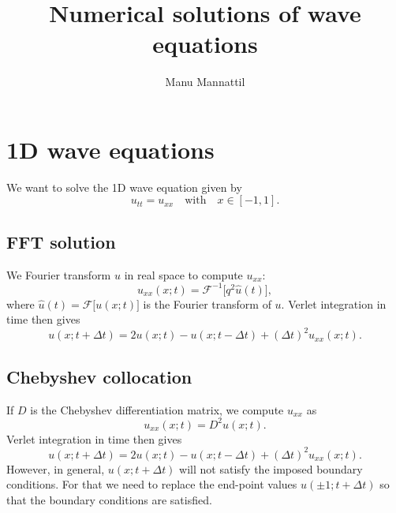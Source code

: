\documentclass[11pt]{article}
\def\FT#1{\ensuremath{\mathcal{F}{#1}}}
\def\FTI#1{\ensuremath{\mathcal{F}^{-1}{#1}}}
\begin{document}
\title{Numerical solutions of wave equations}
\author{Manu Mannattil}
\maketitle

\section{1D wave equations}

We want to solve the 1D wave equation given by
%
\begin{equation}
  u_{tt} = u_{xx}\quad\text{with}\quad x \in [-1, 1].
\end{equation}
%

\subsection{FFT solution}

We Fourier transform $u$ in real space to compute $u_{xx}$:
%
\begin{equation}
  u_{xx}(x; t) = \FTI[q^{2}\hat{u}(t)],
\end{equation}
%
where $\hat{u}(t) = \FT[u(x; t)]$ is the Fourier transform of $u$.
Verlet integration in time then gives
%
\begin{equation}
  u(x; {t + \Delta t}) = 2u(x; t) - u(x; t - \Delta t) + (\Delta t)^{2}u_{xx}(x; t).
\end{equation}

\subsection{Chebyshev collocation}

If $D$ is the Chebyshev differentiation matrix, we compute $u_{xx}$ as
%
\begin{equation}
  u_{xx}(x; t) = D^{2}u(x; t).
\end{equation}
%
Verlet integration in time then gives
%
\begin{equation}
  u(x; {t + \Delta t}) = 2u(x; t) - u(x; t - \Delta t) + (\Delta t)^{2}u_{xx}(x; t).
\end{equation}
%
However, in general, $u(x; t + \Delta t)$ will not satisfy the imposed boundary conditions.
For that we need to replace the end-point values $u(\pm 1; t + \Delta t)$ so that the boundary conditions are satisfied.
\end{document}
